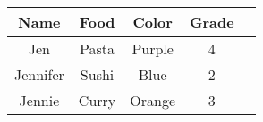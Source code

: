 
\begin{center}
\begin{tabular}{|c|c|c|c|c|}
 \hline
 \textbf{Name} & \textbf{Food} & \textbf{Color} & \textbf{Grade} \\
 \hline
 Jen & Pasta & Purple & 4 \\
 \hline
 Jennifer & Sushi & Blue & 2 \\
 \hline
  Jennie & Curry & Orange & 3
 \hline
\end{tabular}
\end{center}
